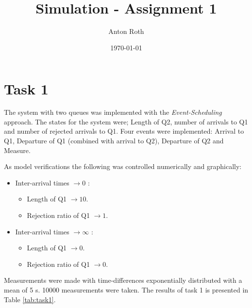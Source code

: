 \documentclass[]{article}
\title{Simulation - Assignment 1}
\author{Anton Roth}
\date{\today}
\begin{document}
\begin{titlepage}
  \maketitle
  \thispagestyle{empty}
\end{titlepage}

\section{Task 1}
The system with two queues was implemented with the {\it Event-Scheduling} approach. The states for the system were; Length of Q2, number of arrivals to Q1 and number of rejected arrivals to Q1. Four events were implemented: Arrival to Q1, Departure of Q1 (combined with arrival to Q2), Departure of Q2 and Measure.

As model verifications the following was controlled numerically and graphically:
\begin{itemize}
  \item Inter-arrival times $\rightarrow 0$ :
    \begin{itemize}
      \item Length of Q1 $\rightarrow 10$.
      \item Rejection ratio of Q1 $\rightarrow 1$.
    \end{itemize}
  \item Inter-arrival times $\rightarrow \infty$ :
    \begin{itemize}
      \item Length of Q1 $\rightarrow 0$.
      \item Rejection ratio of Q1 $\rightarrow 0$.
    \end{itemize}
\end{itemize}

Measurements were made with time-differences exponentially distributed with a mean of 5 s. 10000 measurements were taken. The results of task 1 is presented in Table \ref{tab:task1}.
\end{document}
